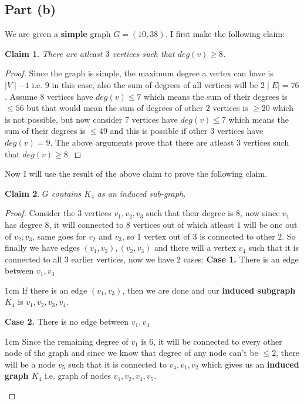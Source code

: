 \documentclass{article}
\let\bold\textbf
\newtheorem{claim}{Claim}[subsection]
\newenvironment{myenv}{\begin{adjustwidth}{1cm}{}}{\end{adjustwidth}}
\begin{document}
{  \subsection{Part (b)}{
    We are given a \bold{simple} graph $G=(10,38)$. I first make the following claim:
    \begin{claim}
      There are atleast $3$ vertices such that $deg(v) \geq 8$.
    \end{claim}
    \begin{proof}
      Since the graph is simple, the maximum degree a vertex can have is $\mid V \mid -1$ i.e. $9$ in this case, also the sum of degrees of all vertices will be $2 \mid E \mid = 76$. \newline
      Assume $8$ vertices have $deg(v) \leq 7$ which means the sum of their degrees is $\leq 56$ but that would mean the sum of degrees of other $2$ vertices is $\geq 20$ which is not possible, but now consider $7$ vertices have $deg(v) \leq 7$ which means the sum of their degrees is $\leq 49$ and this is possible if other $3$ vertices have $deg(v)=9$. \newline
      The above arguments prove that there are atleast $3$ vertices such that $deg(v) \geq 8$.
    \end{proof}
    Now I will use the result of the above claim to prove the following claim.
    \begin{claim}
      $G$ contains $K_4$ as an induced sub-graph.
    \end{claim}
    \begin{proof}
      Consider the $3$ vertices $v_1,v_2,v_3$ such that their degree is $8$, now since $v_1$ has degree $8$, it will connected to $8$ vertices out of which atleast $1$ will be one out of $v_2,v_3$, same goes for $v_2$ and $v_3$, so $1$ vertex out of $3$ is connected to other $2$. \newline
      So finally we have edges $(v_1,v_2),(v_2,v_3)$ and there will a vertex $v_4$ such that it is connected to all $3$ earlier vertices, now we have $2$ cases: \newline
      \bold{Case 1.} There is an edge between $v_1,v_3$
      \begin{myenv}
        If there is an edge $(v_1,v_3)$, then we are done and our \bold{induced subgraph $K_4$} is $v_1,v_2,v_3,v_4$.
      \end{myenv}
      \bold{Case 2.} There is no edge between $v_1,v_3$
      \begin{myenv}
        Since the remaining degree of $v_1$ is $6$, it will be connected to every other node of the graph and since we know that degree of any node can't be $ \leq 2$, there will be a node $v_5$ such that it is connected to $v_4,v_1,v_2$ which gives us an \bold{induced graph $K_4$} i.e. graph of nodes $v_1,v_2,v_4,v_5$.
      \end{myenv}
    \end{proof}
  }
}
\end{document}
